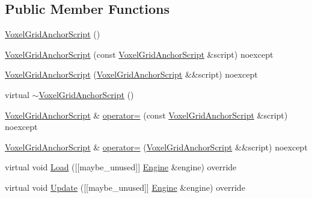 \subsection*{Public Member Functions}
\begin{DoxyCompactItemize}
\item 
\mbox{\hyperlink{classmage_1_1script_1_1_voxel_grid_anchor_script_a49e5cfeab3dd3962e9f7a915804ad3e7}{Voxel\+Grid\+Anchor\+Script}} ()
\item 
\mbox{\hyperlink{classmage_1_1script_1_1_voxel_grid_anchor_script_a3058e395b299edb79129530963ff05dc}{Voxel\+Grid\+Anchor\+Script}} (const \mbox{\hyperlink{classmage_1_1script_1_1_voxel_grid_anchor_script}{Voxel\+Grid\+Anchor\+Script}} \&script) noexcept
\item 
\mbox{\hyperlink{classmage_1_1script_1_1_voxel_grid_anchor_script_a79289129e546c17775ea6537f6614b94}{Voxel\+Grid\+Anchor\+Script}} (\mbox{\hyperlink{classmage_1_1script_1_1_voxel_grid_anchor_script}{Voxel\+Grid\+Anchor\+Script}} \&\&script) noexcept
\item 
virtual \mbox{\hyperlink{classmage_1_1script_1_1_voxel_grid_anchor_script_ab59aa3f86027cddb5140abcc7dd919ac}{$\sim$\+Voxel\+Grid\+Anchor\+Script}} ()
\item 
\mbox{\hyperlink{classmage_1_1script_1_1_voxel_grid_anchor_script}{Voxel\+Grid\+Anchor\+Script}} \& \mbox{\hyperlink{classmage_1_1script_1_1_voxel_grid_anchor_script_a7c717a96317052b07c8c90d9c2c73103}{operator=}} (const \mbox{\hyperlink{classmage_1_1script_1_1_voxel_grid_anchor_script}{Voxel\+Grid\+Anchor\+Script}} \&script) noexcept
\item 
\mbox{\hyperlink{classmage_1_1script_1_1_voxel_grid_anchor_script}{Voxel\+Grid\+Anchor\+Script}} \& \mbox{\hyperlink{classmage_1_1script_1_1_voxel_grid_anchor_script_aca3a03b0192c968e2725f92a453618d7}{operator=}} (\mbox{\hyperlink{classmage_1_1script_1_1_voxel_grid_anchor_script}{Voxel\+Grid\+Anchor\+Script}} \&\&script) noexcept
\item 
virtual void \mbox{\hyperlink{classmage_1_1script_1_1_voxel_grid_anchor_script_aca9d52f124cbedfe7daade62366d4c0a}{Load}} (\mbox{[}\mbox{[}maybe\+\_\+unused\mbox{]}\mbox{]} \mbox{\hyperlink{classmage_1_1_engine}{Engine}} \&engine) override
\item 
virtual void \mbox{\hyperlink{classmage_1_1script_1_1_voxel_grid_anchor_script_ae882db064cdf0e4fc524ad521ab51cf3}{Update}} (\mbox{[}\mbox{[}maybe\+\_\+unused\mbox{]}\mbox{]} \mbox{\hyperlink{classmage_1_1_engine}{Engine}} \&engine) override
\end{DoxyCompactItemize}
